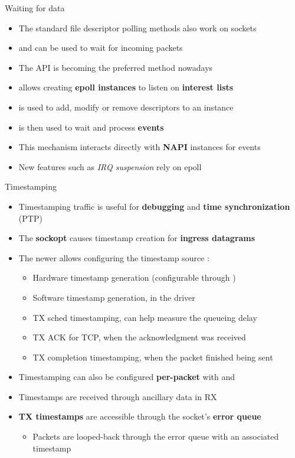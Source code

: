 \begin{frame}{Waiting for data}
	\begin{itemize}
		\item The standard file descriptor polling methods also work on sockets
		\item {} and  can be used to wait for incoming packets
		\item The  API is becoming the preferred method nowadays
		\item {} allows creating \textbf{epoll instances} to listen on \textbf{interest lists}
		\item {} is used to add, modify or remove descriptors to an instance
		\item {} is then used to wait and process \textbf{events}
		\item This mechanism interacts directly with \textbf{NAPI} instances for events
		\item New features such as \textit{IRQ suspension} rely on epoll
	\end{itemize}
\end{frame}

\begin{frame}{Timestamping}
	\begin{itemize}
		\item Timestamping traffic is useful for \textbf{debugging} and \textbf{time synchronization} (PTP)
		\item The  \textbf{sockopt} causes timestamp creation for \textbf{ingress datagrams}
		\item The newer  allows configuring the timestamp source :
			\begin{itemize}
				\item Hardware timestamp generation (configurable through )
				\item Software timestamp generation, in the driver
				\item TX sched timestamping, can help measure the queueing delay
				\item TX ACK for TCP, when the acknowledgment was received
				\item TX completion timestamping, when the packet finished being sent
			\end{itemize}
		\item Timestamping can also be configured \textbf{per-packet} with  and 
		\item Timestamps are received through  ancillary data in RX
		\item \textbf{TX timestamps} are accessible through the socket's \textbf{error queue}
			\begin{itemize}
				\item Packets are looped-back through the error queue with an associated timestamp
			\end{itemize}
	\end{itemize}
\end{frame}

